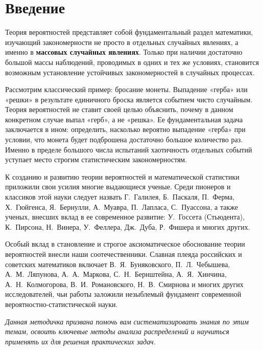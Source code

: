 \section*{Введение}

Теория вероятностей представляет собой фундаментальный раздел математики, изучающий закономерности не просто в отдельных случайных явлениях, а именно в \textbf{массовых случайных явлениях}. Только при наличии достаточно большой массы наблюдений, проводимых в одних и тех же условиях, становится возможным установление устойчивых закономерностей в случайных процессах. 

Рассмотрим классический пример: бросание монеты. Выпадение «герба» или «решки» в результате единичного броска является событием чисто случайным. Теория вероятностей не ставит своей целью объяснить, почему в данном конкретном случае выпал «герб», а не «решка». Ее фундаментальная задача заключается в ином: определить, насколько вероятно выпадение «герба» при условии, что монета будет подброшена достаточно большое количество раз. Именно в пределе большого числа испытаний хаотичность отдельных событий уступает место строгим статистическим закономерностям.

К созданию и развитию теории вероятностей и математической статистики приложили свои усилия многие выдающиеся ученые. Среди пионеров и классиков этой науки следует назвать Г.~Галилея, Б.~Паскаля, П.~Ферма, Х.~Гюйгенса, Я.~Бернулли, А.~Муавра, П.~Лапласа, С.~Пуассона, а также ученых, внесших вклад в ее современное развитие: У.~Госсета (Стьюдента), К.~Пирсона, Н.~Винера, У.~Феллера, Дж.~Дуба, Р.~Фишера и многих других.

Особый вклад в становление и строгое аксиоматическое обоснование теории вероятностей внесли наши соотечественники. Славная плеяда российских и советских математиков включает В.~Я.~Буняковского, П.~Л.~Чебышева, А.~М.~Ляпунова, А.~А.~Маркова, С.~Н.~Бернштейна, А.~Я.~Хинчина, А.~Н.~Колмогорова, В.~И.~Романовского, Н.~В.~Смирнова и многих других исследователей, чьи работы заложили незыблемый фундамент современной вероятностно-статистической науки.

\vspace{1em}
\noindent\textit{Данная методичка призвана помочь вам систематизировать знания по этим темам, освоить ключевые методы анализа распределений и научиться применять их для решения практических задач.}